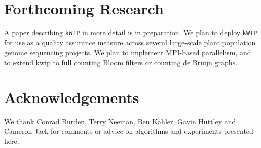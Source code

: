 \documentclass[a0,portrait]{a0poster}
\begin{document}
\begin{multicols}{2}
\normalsize
\color{Black}


\section*{Forthcoming Research}

A paper describing \texttt{kWIP} in more detail is in preparation. We plan to
deploy \texttt{kWIP} for use as a quality assurance measure across several
large-scale plant population genome sequencing projects. We plan to implement
MPI-based parallelism, and to extend kwip to full counting Bloom filters or
counting de Bruijn graphs.


\section*{Acknowledgements}

We thank Conrad Burden, Terry Neeman, Ben Kahler, Gavin Huttley and Cameron
Jack for comments or advice on algorithms and experiments presented here.

\end{multicols}
\begin{multicols}{2}


\tiny
\printbibliography
\normalsize

\end{multicols}
\end{document}
